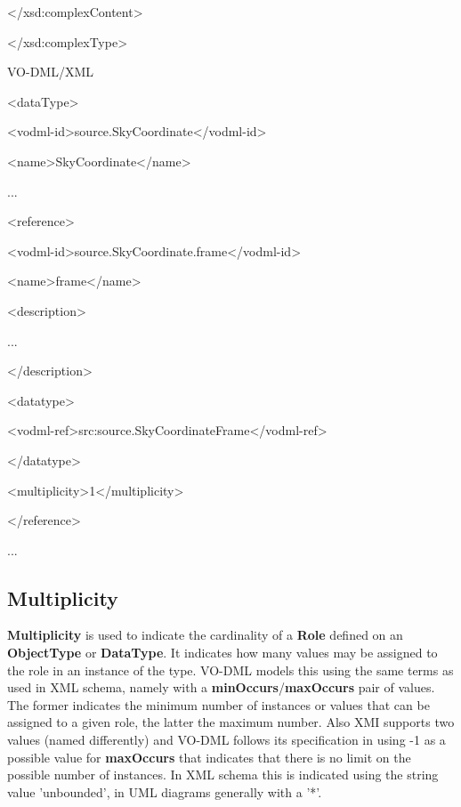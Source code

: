 \documentclass[10pt,a4paper]{ivoa}
\begin{document}
\textless/xsd:complexContent\textgreater{}

\textless/xsd:complexType\textgreater{}

VO-DML/XML

\textless dataType\textgreater{}

\textless vodml-id\textgreater source.SkyCoordinate\textless/vodml-id\textgreater{}

\textless name\textgreater SkyCoordinate\textless/name\textgreater{}

...

\textless reference\textgreater{}

\textless vodml-id\textgreater source.SkyCoordinate.frame\textless/vodml-id\textgreater{}

\textless name\textgreater frame\textless/name\textgreater{}

\textless description\textgreater{}

...

\textless/description\textgreater{}

\textless datatype\textgreater{}

\textless vodml-ref\textgreater src:source.SkyCoordinateFrame\textless/vodml-ref\textgreater{}

\textless/datatype\textgreater{}

\textless multiplicity\textgreater1\textless/multiplicity\textgreater{}

\textless/reference\textgreater{}

...

\hypertarget{multiplicity}{%
\subsection{Multiplicity}\label{multiplicity}}

\textbf{Multiplicity} is used to indicate the cardinality of a
\textbf{Role} defined on an \textbf{ObjectType} or \textbf{DataType}. It
indicates how many values may be assigned to the role in an instance of
the type. VO-DML models this using the same terms as used in XML schema,
namely with a \textbf{minOccurs}/\textbf{maxOccurs} pair of values. The
former indicates the minimum number of instances or values that can be
assigned to a given role, the latter the maximum number. Also XMI
supports two values (named differently) and VO-DML follows its
specification in using -1 as a possible value for \textbf{maxOccurs}
that indicates that there is no limit on the possible number of
instances. In XML schema this is indicated using the string value
'unbounded', in UML diagrams generally with a '*'.
\end{document}
